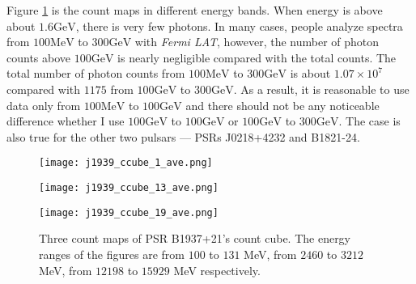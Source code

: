 \documentclass[12pt]{report}
\begin{document}
        Figure \ref{fig: j1939_count_cube_ave} is the count maps in different energy bands.
        When energy is above about $1.6\mbox{GeV}$, there is very few photons. In many cases,
        people analyze spectra from $100\mbox{MeV}$ to $300\mbox{GeV}$ with 
        \textit{Fermi LAT}, however, the number of photon counts above $100\mbox{GeV}$ is 
        nearly negligible compared with the total counts. The total number of photon counts 
        from $100\mbox{MeV}$ to $300\mbox{GeV}$ is about $1.07\times10^7$ compared with 
        $1175$ from $100\mbox{GeV}$ to $300\mbox{GeV}$. As a result, it is reasonable to 
        use data only from $100\mbox{MeV}$ to $100\mbox{GeV}$ and there should not be any 
        noticeable difference whether I use $100\mbox{GeV}$ to $100\mbox{GeV}$ or 
        $100\mbox{GeV}$ to $300\mbox{GeV}$. The case is also true for 
        the other two pulsars --- PSRs J0218+4232 and B1821-24. 

        \begin{figure}[!htp]
          \begin{minipage}{0.32\textwidth}
            \begin{center} 
              \texttt{[image: j1939\_ccube\_1\_ave.png]}
            \end{center}
          \end{minipage}
          \begin{minipage}{0.32\textwidth}
            \begin{center}
              \texttt{[image: j1939\_ccube\_13\_ave.png]}
            \end{center}
          \end{minipage}
          \begin{minipage}{0.32\textwidth}
            \begin{center}
            \texttt{[image: j1939\_ccube\_19\_ave.png]}
            \end{center}
          \end{minipage}
          \caption{Three count maps of PSR B1937+21's count cube. The energy ranges of the 
            figures are from $100$ to $131$ MeV, from $2460$ to $3212$ MeV, from $12198$ to
            $15929$ MeV respectively.}
          \label{fig: j1939_count_cube_ave}
        \end{figure}
\end{document}
